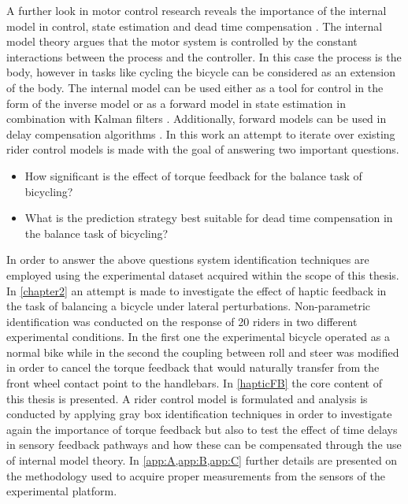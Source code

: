 A further look in motor control research  reveals the importance of the internal model in control, state estimation and dead time compensation \cite{francis1976internal, garcia1982internal, wolpert1995internal, gillespie2016human}. The internal model  theory argues that the motor system is controlled by the constant interactions between the process and the controller. In this case the process is the body, however in tasks like cycling the bicycle can be considered as an extension of the body. The internal model can be used either as a tool for control in the form of the inverse model \cite{edelmann2015,getz1995internal} or as a forward model in state estimation in combination with Kalman filters \cite{wolpert1995internal}. Additionally, forward models can be used in delay compensation algorithms \cite{miall1993cerebellum,van2001adaptive}. 
\newpage
In this work an attempt to iterate over existing rider control models is made with the goal of answering two important questions. 
\begin{itemize}
        \item How significant is the effect of torque feedback for the balance task of bicycling?
        \item What is the prediction strategy best suitable for dead time  compensation in the balance task of bicycling?
\end{itemize}

In order to answer the above questions system identification techniques are employed using  the experimental dataset acquired within the scope of this thesis. In \cref{chapter2} an attempt is made to investigate the effect of haptic feedback in the task of balancing a bicycle under lateral perturbations. Non-parametric identification was conducted on the response of 20 riders in two different experimental conditions. In the first one the experimental bicycle operated as a normal bike while in the second the coupling between roll and steer was modified in order to cancel the torque feedback that would naturally transfer from the front wheel contact point to the handlebars. In \cref{hapticFB} the core content of this thesis is presented. A rider control model is formulated and  analysis is conducted by applying gray box identification techniques in order to investigate again the importance of torque feedback but also to test the effect of time delays in sensory feedback pathways and how these can be compensated through the use of internal model theory. In \cref{app:A,app:B,app:C} further details are presented on the methodology used to acquire proper measurements from the sensors of the experimental platform.



